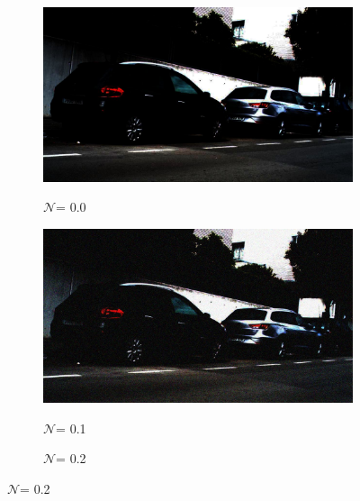 \documentclass[a4paper]{ctexart}
\begin{document}
	\begin{figure}[htbp]
		\centering
		\begin{subfigure}{0.02\textwidth}
			\captionsetup{font=scriptsize}
			\caption*{}
			\vspace{-2pt}
		\end{subfigure}
		\begin{subfigure}{0.08\textwidth}
			\captionsetup{font=scriptsize}
			\caption*{$\mathcal{N}$= 0.0}
			\includegraphics[width=\linewidth]{picture/Edge Detection/degrade/RGB_001 Gamma=0.1, Gauss Noise=0.0}
			\label{fig: Gamma=0.1, Gauss Noise = 0.0}
		\end{subfigure}
		\begin{subfigure}{0.08\textwidth}
			\captionsetup{font=scriptsize}
			\caption*{$\mathcal{N}$= 0.1}
			\includegraphics[width=\linewidth]{picture/Edge Detection/degrade/RGB_001 Gamma=0.1, Gauss Noise=0.1}
			\label{fig：Gamma=0.1, Gauss Noise = 0.1}
		\end{subfigure}
		\begin{subfigure}{0.08\textwidth}
			\captionsetup{font=scriptsize}
			\caption*{$\mathcal{N}$= 0.2}

\end{subfigure}
\end{figure}
\end{document}
